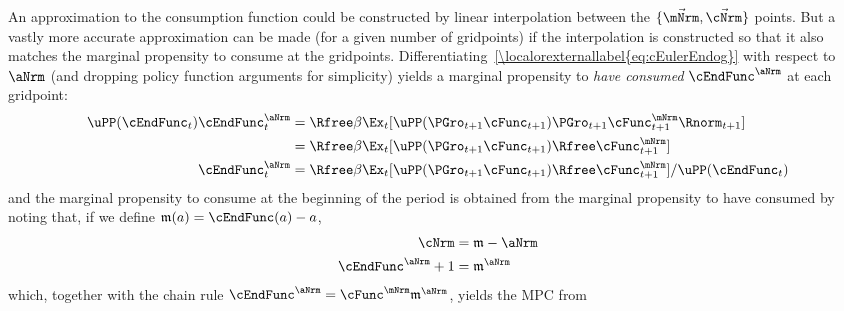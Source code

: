 \documentclass[\econtexRoot/BufferStockTheory]{subfiles}
\begin{document}
An approximation to the consumption function could be constructed by linear interpolation between the $\{\vec{\mNrm},\vec{\cNrm}\}$ points.  But a vastly more accurate approximation can be made (for a given number of gridpoints) if the interpolation is constructed so that it also matches the marginal propensity to consume at the gridpoints. Differentiating~\eqref{\localorexternallabel{eq:cEulerEndog}} with respect to $\aNrm$ (and dropping policy function arguments for simplicity) yields a marginal propensity to \textit{have consumed} $\cEndFunc^{\aNrm}$ at each gridpoint:
\begin{equation}\begin{gathered}\begin{aligned}
\uPP(\cEndFunc_{t})\cEndFunc_{t}^{\aNrm}  & = \Rfree \beta \Ex_{t}[\uPP(\PGro_{t+1} \cFunc_{t+1})\PGro_{t+1} \cFunc^{\mNrm}_{t+1}\Rnorm_{t+1}] \notag
\\  & = \Rfree \beta \Ex_{t}[\uPP(\PGro_{t+1} \cFunc_{t+1}) \Rfree \cFunc^{\mNrm}_{t+1}] \notag
\\ \cEndFunc_{t}^{\aNrm}  & = \Rfree \beta \Ex_{t}[\uPP(\PGro_{t+1}  \cFunc_{t+1}) \Rfree \cFunc^{\mNrm}_{t+1}]/\uPP(\cEndFunc_{t}) \label{eq:MPTHC}
\end{aligned}\end{gathered}\end{equation}
and the marginal propensity to consume at the beginning of the period is obtained from the marginal
propensity to have consumed by noting that, if we define $\mathfrak{m}(a) = \cEndFunc(a)-a$,
\begin{align*}
   \cNrm  & = \mathfrak{m}-\aNrm
\\ \cEndFunc^{\aNrm}+1  & = \mathfrak{m}^{\aNrm}
\end{align*}
which, together with the chain rule $\cEndFunc^{\aNrm}  = \cFunc^{\mNrm}\mathfrak{m}^{\aNrm}$,
yields the MPC from
\end{document}
